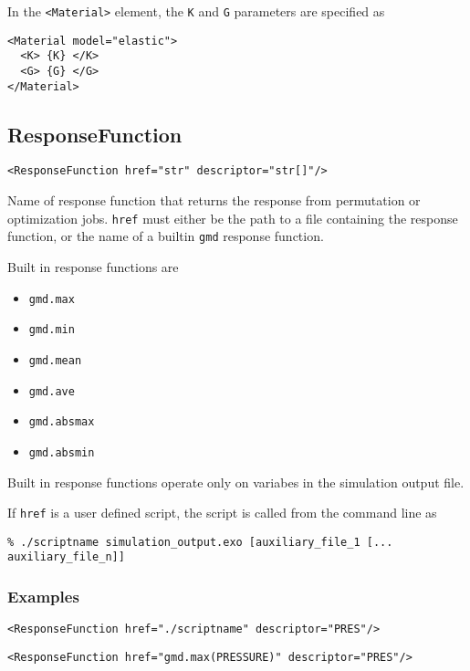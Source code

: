 \documentclass[11pt]{report}
\newcommand{\gmd}{\texttt{gmd}}
\renewcommand{\tag}[1]{\texttt{<#1>}}
\begin{document}
In the \tag{Material} element, the \texttt{K} and \texttt{G} parameters are
specified as
%
\begin{verbatim}
<Material model="elastic">
  <K> {K} </K>
  <G> {G} </G>
</Material>
\end{verbatim}

\subsection{ResponseFunction}
\begin{verbatim}
<ResponseFunction href="str" descriptor="str[]"/>
\end{verbatim}
Name of response function that returns the response from permutation or
optimization jobs.  \texttt{href} must either be the path to a file containing
the response function, or the name of a builtin \gmd{} response function.

Built in response functions are
%
\begin{itemize}
  \item \texttt{gmd.max}
  \item \texttt{gmd.min}
  \item \texttt{gmd.mean}
  \item \texttt{gmd.ave}
  \item \texttt{gmd.absmax}
  \item \texttt{gmd.absmin}
\end{itemize}
%
Built in response functions operate only on variabes in the simulation output file.

If \texttt{href} is a user defined script, the script is called from the
command line as
\begin{verbatim}
% ./scriptname simulation_output.exo [auxiliary_file_1 [... auxiliary_file_n]]
\end{verbatim}

\subsubsection{Examples}
\begin{verbatim}
<ResponseFunction href="./scriptname" descriptor="PRES"/>
\end{verbatim}


\begin{verbatim}
<ResponseFunction href="gmd.max(PRESSURE)" descriptor="PRES"/>
\end{verbatim}
\end{document}
